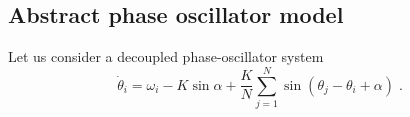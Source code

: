 \documentclass{article}
\begin{document}



\subsection{Abstract phase oscillator model}
Let us consider a decoupled phase-oscillator system 
\begin{equation}
    \dot{\theta}_i=\omega _i-K\sin \alpha +\frac{K}{N}\sum_{j=1}^N{\sin \left( \theta _j-\theta _i+\alpha \right)}\;.
    \label{eq:decoupledPhaseModel}
\end{equation}
\end{document}
